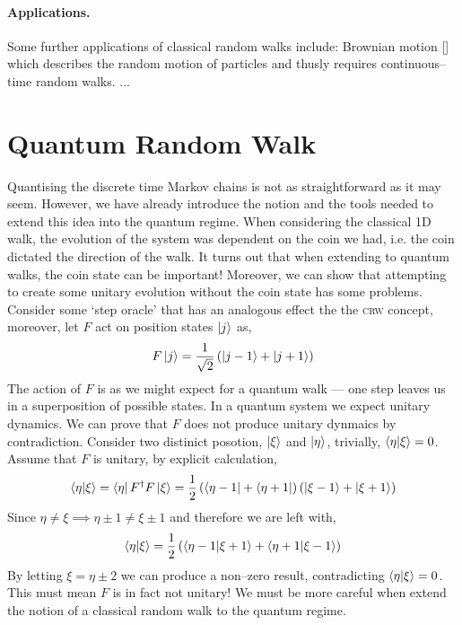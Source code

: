 \documentclass{article}
\begin{document}
\paragraph{Applications.} Some further applications of classical random walks include: Brownian motion [] which describes the random motion of particles and thusly requires continuous--time random walks. ...

\section{Quantum Random Walk}
Quantising the discrete time Markov chains is not as straightforward as it may seem. However, we have already introduce the notion and the tools needed to extend this idea into the quantum regime. When considering the classical 1D walk, the evolution of the system was dependent on the coin we had, i.e. the coin dictated the direction of the walk. It turns out that when extending to quantum walks, the coin state can be important! Moreover, we can show that attempting to create some unitary evolution without the coin state has some problems. Consider some `step oracle' that has an analogous effect the the \textsc{crw} concept, moreover, let $F$ act on position states $\ket{j}$ as,
\begin{equation}
    F\ket{j} = \frac{1}{\sqrt{2}}\left(\ket{j-1} + \ket{j+1} \right)
\end{equation}
The action of $F$ is as we might expect for a quantum walk --- one step leaves us in a superposition of possible states. In a quantum system we expect unitary dynamics. We can prove that $F$ does not produce unitary dynmaics by contradiction. Consider two distinict posotion, $\ket{\xi}$ and $\ket{\eta}$, trivially, $\braket{\eta}{\xi}=0$. Assume that $F$ is unitary, by explicit calculation,
\begin{equation*}
    \braket{\eta}{\xi} = \bra{\eta}F^\dagger F\ket{\xi} = \frac{1}{2}\left(\bra{\eta-1}+\bra{\eta+1} \right)\left(\ket{\xi-1}+\ket{\xi+1} \right)
\end{equation*}
Since $\eta\neq\xi \implies \eta\pm1\neq\xi\pm1$ and therefore we are left with,
\begin{equation*}
    \braket{\eta}{\xi} = \frac{1}{2}\left(\bra{\eta-1}\ket{\xi+1}+\bra{\eta+1}\ket{\xi-1} \right)
\end{equation*}
By letting $\xi=\eta\pm2$ we can produce a non--zero result, contradicting $\braket{\eta}{\xi}=0$. This must mean $F$ is in fact not unitary! We must be more careful when extend the notion of a classical random walk to the quantum regime.
\end{document}
